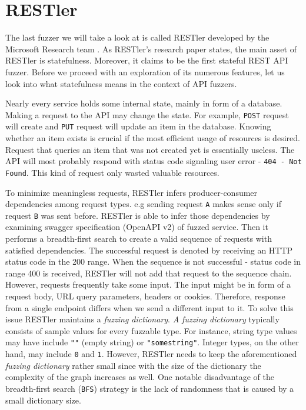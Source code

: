 \section{RESTler}
\label{sec:restler}
The last fuzzer we will take a look at is called RESTler developed by the Microsoft Research team \cite{atlidakis2019restler}. As RESTler's research paper states, the main asset of RESTler is statefulness. Moreover, it claims to be the first stateful REST API fuzzer. Before we proceed with an exploration of its numerous features, let us look into what statefulness means in the context of API fuzzers.

Nearly every service holds some internal state, mainly in form of a database. Making a request to the API may change the state. For example, \texttt{POST} request will create and \texttt{PUT} request will update an item in the database. Knowing whether an item exists is crucial if the most efficient usage of resources is desired. Request that queries an item that was not created yet is essentially useless. The API will most probably respond with status code signaling user error - \texttt{404 - Not Found}. This kind of request only wasted valuable resources.

To minimize meaningless requests, RESTler infers producer-consumer dependencies among request types. e.g sending request \texttt{A} makes sense only if request \texttt{B} was sent before. RESTler is able to infer those dependencies by examining swagger specification (OpenAPI v2) of fuzzed service. Then it performs a breadth-first search to create a valid sequence of requests with satisfied dependencies. The successful request is denoted by receiving an HTTP status code in the 200 range. When the sequence is not successful - status code in range 400 is received, RESTler will not add that request to the sequence chain. However, requests frequently take some input. The input might be in form of a request body, URL query parameters, headers or cookies. Therefore, response from a single endpoint differs when we send a different input to it. To solve this issue RESTler maintains a \textit{fuzzing dictionary}. \textit{A fuzzing dictionary} typically consists of sample values for every fuzzable type. For instance, string type values may have include \texttt{""} (empty string) or \texttt{"somestring"}. Integer types, on the other hand, may include \texttt{0} and \texttt{1}. However, RESTler needs to keep the aforementioned \textit{fuzzing dictionary} rather small since with the size of the dictionary the complexity of the graph increases as well. One notable disadvantage of the breadth-first search (\texttt{BFS}) strategy is the lack of randomness that is caused by a small dictionary size.

